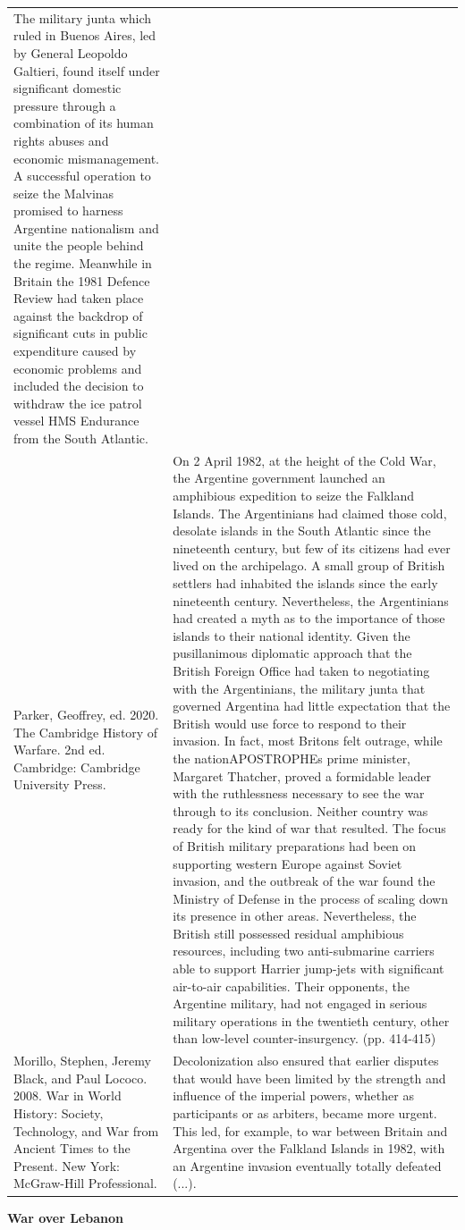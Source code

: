 {\begin{longtable}{p{}p{}}
The military junta which ruled in Buenos Aires, led by General Leopoldo Galtieri, found itself under significant domestic pressure through a combination of its human rights abuses and economic mismanagement. A successful operation to seize the Malvinas promised to harness Argentine nationalism and unite the people behind the regime. Meanwhile in Britain the 1981 Defence Review had taken place against the backdrop of significant cuts in public expenditure caused by economic problems and included the decision to withdraw the ice patrol vessel HMS Endurance from the South Atlantic.
\\
Parker, Geoffrey, ed. 2020. The Cambridge History of Warfare. 2nd ed. Cambridge: Cambridge University Press. & On 2 April 1982, at the height of the Cold War, the Argentine government launched an amphibious expedition to seize the Falkland Islands. The Argentinians had claimed those cold, desolate islands in the South Atlantic since the nineteenth century, but few of its citizens had ever lived on the archipelago. A small group of British settlers had inhabited the islands since the early nineteenth century. Nevertheless, the Argentinians had created a myth as to the importance of those islands to their national identity. Given the pusillanimous diplomatic approach that the British Foreign Office had taken to negotiating with the Argentinians, the military junta that governed Argentina had little expectation that the British would use force to respond to their invasion. In fact, most Britons felt outrage, while the nationAPOSTROPHEs prime minister, Margaret Thatcher, proved a formidable leader with the ruthlessness necessary to see the war through to its conclusion. Neither country was ready for the kind of war that resulted. The focus of British military preparations had been on supporting western Europe against Soviet invasion, and the outbreak of the war found the Ministry of Defense in the process of scaling down its presence in other areas. Nevertheless, the British still possessed residual amphibious resources, including two anti-submarine carriers able to support Harrier jump-jets with significant air-to-air capabilities. Their opponents, the Argentine military, had not engaged in serious military operations in the twentieth century, other than low-level counter-insurgency. (pp. 414-415)
\\
Morillo, Stephen, Jeremy Black, and Paul Lococo. 2008. War in World History: Society, Technology, and War from Ancient Times to the Present. New York: McGraw-Hill Professional. & Decolonization also ensured that earlier disputes that would have been limited by the strength and influence of the imperial powers, whether as participants or as arbiters, became more urgent. This led, for example, to war between Britain and Argentina over the Falkland Islands in 1982, with an Argentine invasion eventually totally defeated (...).
\\
\end{longtable}}
\clearpage
         \textbf{War over Lebanon} 

